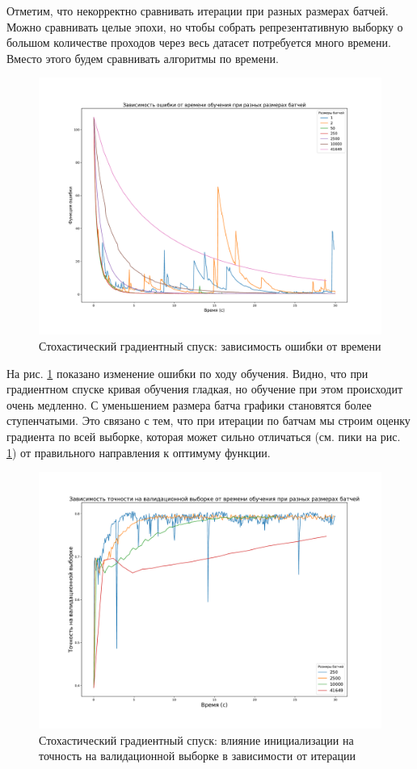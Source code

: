 \documentclass{article}
\begin{document}
                Отметим, что некорректно сравнивать итерации при разных размерах батчей. Можно сравнивать целые эпохи, но чтобы собрать репрезентативную выборку о большом количестве проходов через весь датасет потребуется много времени. Вместо этого будем сравнивать алгоритмы по времени.

                \begin{figure}[H]
                    \centering
                    \includegraphics[width=0.8\linewidth]{./pictures/GDbatch_func.pdf}
                    \caption{Стохастический градиентный спуск: зависимость ошибки от времени }
                    \label{fig:8}
                \end{figure}
                На рис. \ref{fig:8} показано изменение ошибки по ходу обучения. Видно, что при градиентном спуске кривая обучения гладкая, но обучение при этом происходит очень медленно. С уменьшением размера батча графики становятся более ступенчатыми. Это связано с тем, что при итерации по батчам мы строим оценку градиента по всей выборке, которая может сильно отличаться (см. пики на рис. \ref{fig:8}) от правильного направления к оптимуму функции.
                \begin{figure}[t]
                    \centering
                    \includegraphics[width=0.8\linewidth]{./pictures/GDbatch_val_accuracy.pdf}
                    \caption{Стохастический градиентный спуск: влияние инициализации на точность на валидационной выборке в зависимости от итерации}
                    \label{fig:9}
                \end{figure}
                
\end{document}
